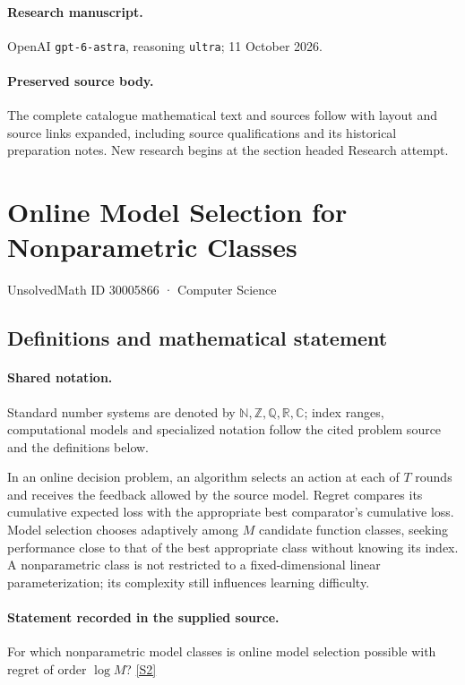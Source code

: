 \documentclass[11pt]{article}
\begin{document}
\paragraph{Research manuscript.} OpenAI \texttt{gpt-6-astra}, reasoning \texttt{ultra}; 11 October 2026.
\paragraph{Preserved source body.} The complete catalogue mathematical text and sources follow with layout and source links expanded, including source qualifications and its historical preparation notes. New research begins at the section headed Research attempt.

\section{Online Model Selection for Nonparametric Classes}\label{30005866}
{\small UnsolvedMath ID 30005866 · Computer Science}
\subsection{Definitions and mathematical statement}

\paragraph{Shared notation.}Standard number systems are denoted by $\mathbb N,\mathbb Z,\mathbb Q,\mathbb R,\mathbb C$; index ranges, computational models and specialized notation follow the cited problem source and the definitions below.


In an online decision problem, an algorithm selects an action at each of $T$ rounds and receives the feedback allowed by the source model. Regret compares its cumulative expected loss with the appropriate best comparator's cumulative loss. Model selection chooses adaptively among $M$ candidate function classes, seeking performance close to that of the best appropriate class without knowing its index. A nonparametric class is not restricted to a fixed-dimensional linear parameterization; its complexity still influences learning difficulty.
\paragraph{Statement recorded in the supplied source.}
For which nonparametric model classes is online model selection possible with regret of order $\log M$? \href{https://doi.org/10.4171/owr/2024/24}{[S2]}
\end{document}
